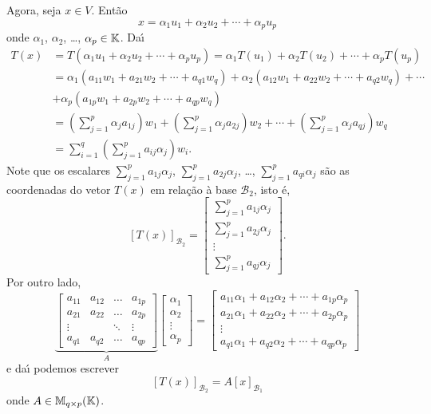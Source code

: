 Agora, seja $x \in V$. Ent\~ao
\[
  x = \alpha_1u_1 + \alpha_2u_2 + \cdots + \alpha_pu_p
\]
onde $\alpha_1$, $\alpha_2$, \dots, $\alpha_p \in \mathbb{K}$. Da{\'\i}
\begin{align*}
  T(x) &= T(\alpha_1u_1 + \alpha_2u_2 + \cdots + \alpha_pu_p) = \alpha_1T(u_1) + \alpha_2T(u_2) + \cdots + \alpha_pT(u_p)\\
  &= \alpha_1(a_{11}w_1 + a_{21}w_2 + \cdots + a_{q1}w_q) + \alpha_2(a_{12}w_1 + a_{22}w_2 + \cdots + a_{q2}w_q) + \cdots \\
  &+ \alpha_p(a_{1p}w_1 + a_{2p}w_2 + \cdots + a_{qp}w_q)\\
  &= (\sum_{j=1}^p\alpha_j a_{1j})w_1 + (\sum_{j=1}^p\alpha_j a_{2j})w_2 + \cdots + (\sum_{j=1}^p\alpha_j a_{qj})w_q\\
  &= \sum_{i=1}^q\left(\sum_{j=1}^p a_{ij}\alpha_j\right)w_i.
\end{align*}
Note que os escalares $\sum_{j=1}^p a_{1j}\alpha_j$, $\sum_{j=1}^p a_{2j}\alpha_j$, \dots, $\sum_{j=1}^p a_{qi}\alpha_j$ s\~ao as coordenadas do vetor $T(x)$ em rela\c{c}\~ao \`a base $\mathcal{B}_2$, isto \'e,
\[
  [T(x)]_{\mathcal{B}_2} = \begin{bmatrix}
    \sum_{j=1}^p a_{1j}\alpha_j\\
    \sum_{j=1}^p a_{2j}\alpha_j\\
    \vdots\\
    \sum_{j=1}^p a_{qj}\alpha_j
  \end{bmatrix}.
\]
Por outro lado,
\[
  \underbrace{\begin{bmatrix}
    a_{11} & a_{12} & \dots & a_{1p}\\
    a_{21} & a_{22} & \dots & a_{2p}\\
    \vdots & & \ddots & \vdots\\
    a_{q1} & a_{q2} & \dots & a_{qp}
  \end{bmatrix}}_{A}\begin{bmatrix}
    \alpha_1\\
    \alpha_2\\
    \vdots\\
    \alpha_p
  \end{bmatrix} = \begin{bmatrix}
    a_{11}\alpha_1 + a_{12}\alpha_2 + \cdots + a_{1p}\alpha_p\\
    a_{21}\alpha_1 + a_{22}\alpha_2 + \cdots + a_{2p}\alpha_p\\
    \vdots \\
    a_{q1}\alpha_1 + a_{q2}\alpha_2 + \cdots + a_{qp}\alpha_p
  \end{bmatrix}
\]
e da{\'\i} podemos escrever
\[
  [T(x)]_{\mathcal{B}_2} = A[x]_{\mathcal{B}_1}
\]
onde $A \in \mathbb{M}_{q\times p}(\mathbb{K})$.

